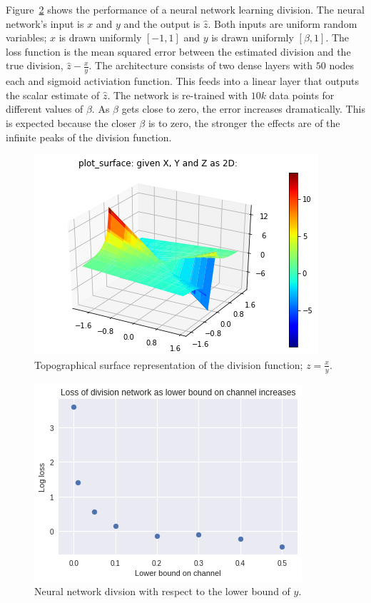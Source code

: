Figure~\ref{fig:one_tap_inv} shows the performance of a neural network learning division.
The neural network's input is $x$ and $y$ and the output is $\hat{z}$.  Both inputs are uniform random variables; $x$ is drawn uniformly $[-1,1]$ and $y$ is drawn uniformly $[\beta,1]$. 
The loss function is the mean squared error between the estimated division and the true division, $\hat{z}-\frac{x}{y}$.
The architecture consists of two dense layers with $50$ nodes each and sigmoid activiation function.  This feeds into a linear layer that outputs the scalar estimate of $\hat{z}$.  
The network is re-trained with $10k$ data points for different values of $\beta$. As $\beta$ gets close to zero, the error increases dramatically.  This is expected because the closer $\beta$ is to zero, the stronger the effects are of the infinite peaks of the division function.

\begin{figure}
\begin{center}
\includegraphics{figures/equal/Division_Function_plot.png}
\caption{Topographical surface representation of the division function; $z=\frac{x}{y}$.}
\label{fig:div_fx}
\end{center}
\end{figure}

\begin{figure}
\begin{center}
\includegraphics{figures/equal/Channel_lower_bound_division.png}
\caption{Neural network divsion with respect to the lower bound of $y$.}
\label{fig:one_tap_inv}
\end{center}
\end{figure}

